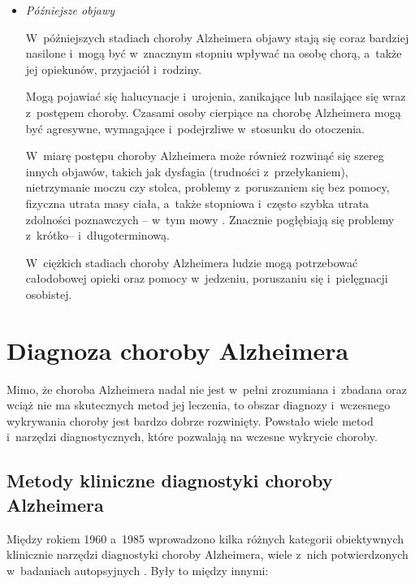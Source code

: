 {\begin{itemize}
        Na tym etapie osoba cierpiąca na chorobę Alzheimera zazwyczaj potrzebuje wsparcia w~codziennym życiu.

  \item \emph{Późniejsze objawy}

        W~późniejszych stadiach choroby Alzheimera objawy stają się coraz bardziej nasilone i~mogą być w~znacznym stopniu wpływać na osobę chorą, a~także jej opiekunów, przyjaciół i~rodziny.

        Mogą pojawiać się halucynacje i~urojenia, zanikające lub nasilające się wraz z~postępem choroby.
        Czasami osoby cierpiące na chorobę Alzheimera mogą być agresywne, wymagające i~podejrzliwe w~stosunku do otoczenia.

        W~miarę postępu choroby Alzheimera może również rozwinąć się szereg innych objawów, takich jak dysfagia (trudności z~przełykaniem), nietrzymanie moczu czy stolca, problemy z~poruszaniem się bez pomocy, fizyczna utrata masy ciała, a~także stopniowa i~często szybka utrata zdolności poznawczych -- w~tym mowy \cite{joe2019cognitive}.
        Znacznie pogłębiają się problemy z~krótko-- i~długoterminową.

        W~ciężkich stadiach choroby Alzheimera ludzie mogą potrzebować całodobowej opieki oraz pomocy w~jedzeniu, poruszaniu się i~pielęgnacji osobistej.

\end{itemize}

\section{Diagnoza choroby Alzheimera}

Mimo, że choroba Alzheimera nadal nie jest w~pełni zrozumiana i~zbadana oraz wciąż nie ma skutecznych metod jej leczenia, to obszar diagnozy i~wczesnego wykrywania choroby jest bardzo dobrze rozwinięty.
Powstało wiele metod i~narzędzi diagnostycznych, które pozwalają na wczesne wykrycie choroby.

\subsection{Metody kliniczne diagnostyki choroby Alzheimera}

Między rokiem 1960 a~1985 wprowadzono kilka różnych kategorii obiektywnych klinicznie narzędzi diagnostyki choroby Alzheimera, wiele z~nich potwierdzonych w~badaniach autopsyjnych \cite{khachaturian2006diagnosis}.
Były to między innymi:

}
